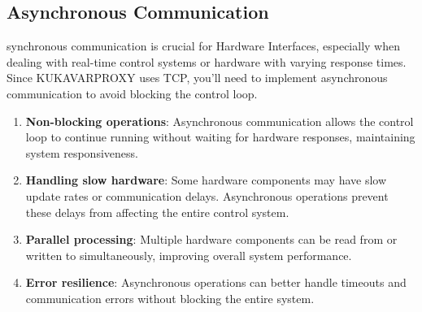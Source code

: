 \subsection{Asynchronous Communication}

synchronous communication is crucial for Hardware Interfaces, especially when dealing with real-time control systems or hardware with varying response times.
Since KUKAVARPROXY uses TCP, you'll need to implement asynchronous communication to avoid blocking the control loop.

\begin{enumerate}
    \item \textbf{Non-blocking operations}: Asynchronous communication allows the control loop to continue running without waiting for hardware responses, maintaining system responsiveness.
    
    \item \textbf{Handling slow hardware}: Some hardware components may have slow update rates or communication delays. Asynchronous operations prevent these delays from affecting the entire control system.
    
    \item \textbf{Parallel processing}: Multiple hardware components can be read from or written to simultaneously, improving overall system performance.
    
    \item \textbf{Error resilience}: Asynchronous operations can better handle timeouts and communication errors without blocking the entire system.
\end{enumerate}
